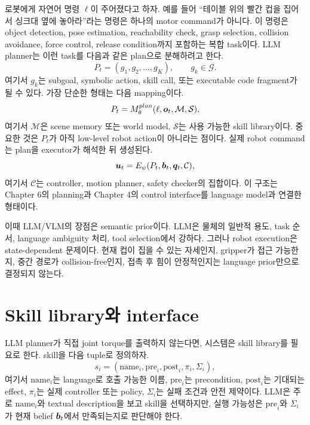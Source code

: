 로봇에게 자연어 명령 $\ell$이 주어졌다고 하자. 예를 들어 ``테이블 위의 빨간 컵을 집어서 싱크대 옆에 놓아라''라는 명령은 하나의 motor command가 아니다. 이 명령은 object detection, pose estimation, reachability check, grasp selection, collision avoidance, force control, release condition까지 포함하는 복합 task이다. LLM planner는 이런 task를 다음과 같은 plan으로 분해하려고 한다.
\begin{equation}
  P_t
  =
  (g_1,g_2,\ldots,g_K),
  \qquad
  g_k \in \mathcal{G}.
  \label{eq:llm-plan-subgoals}
\end{equation}
여기서 $g_k$는 subgoal, symbolic action, skill call, 또는 executable code fragment가 될 수 있다. 가장 단순한 형태는 다음 mapping이다.
\begin{equation}
  P_t
  =
  M_{\theta}^{plan}(\ell,\bm{o}_t,\mathcal{M},\mathcal{S}),
  \label{eq:llm-planner-map}
\end{equation}
여기서 $\mathcal{M}$은 scene memory 또는 world model, $\mathcal{S}$는 사용 가능한 skill library이다. 중요한 것은 $P_t$가 아직 low-level robot action이 아니라는 점이다. 실제 robot command는 plan을 executor가 해석한 뒤 생성된다.
\begin{equation}
  \bm{u}_t
  =
  E_{\psi}(P_t,\bm{b}_t,\bm{q}_t,\mathcal{C}),
  \label{eq:plan-to-control}
\end{equation}
여기서 $\mathcal{C}$는 controller, motion planner, safety checker의 집합이다. 이 구조는 Chapter 6의 planning과 Chapter 4의 control interface를 language model과 연결한 형태이다.

이때 LLM/VLM의 장점은 semantic prior이다. LLM은 물체의 일반적 용도, task 순서, language ambiguity 처리, tool selection에서 강하다. 그러나 robot execution은 state-dependent 문제이다. 현재 컵이 집을 수 있는 자세인지, gripper가 접근 가능한지, 중간 경로가 collision-free인지, 접촉 후 힘이 안정적인지는 language prior만으로 결정되지 않는다.

\section{Skill library와 interface}

LLM planner가 직접 joint torque를 출력하지 않는다면, 시스템은 skill library를 필요로 한다. skill을 다음 tuple로 정의하자.
\begin{equation}
  s_i
  =
  (\mathrm{name}_i,\mathrm{pre}_i,\mathrm{post}_i,\pi_i,\Sigma_i),
  \label{eq:skill-tuple}
\end{equation}
여기서 $\mathrm{name}_i$는 language로 호출 가능한 이름, $\mathrm{pre}_i$는 precondition, $\mathrm{post}_i$는 기대되는 effect, $\pi_i$는 실제 controller 또는 policy, $\Sigma_i$는 실패 조건과 안전 제약이다. LLM은 주로 $\mathrm{name}_i$와 textual description을 보고 skill을 선택하지만, 실행 가능성은 $\mathrm{pre}_i$와 $\Sigma_i$가 현재 belief $\bm{b}_t$에서 만족되는지로 판단해야 한다.

